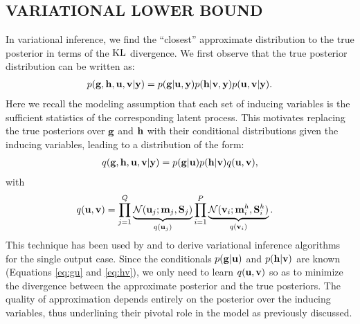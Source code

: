 \subsection{VARIATIONAL LOWER BOUND \label{sec:variationalLowerBound}}
\newcommand{\ug}{\u_g}
\newcommand{\uh}{\u^h}
\newcommand{\mgj}{\m_j}
\newcommand{\mhi}{\m^h_i}
\newcommand{\Sgj}{\S_j}
\newcommand{\Shi}{\S^h_i}
In variational inference, we find the ``closest'' approximate distribution to the true posterior in terms of the $\text{KL}$ divergence.
We first observe that the true posterior distribution can be written as:
\begin{align}
p(\mathbf{g}, \mathbf{h}, \mathbf{u}, \mathbf{v} | \mathbf{y}) = p(\mathbf{g} | \mathbf{u}, \mathbf{y}) p(\mathbf{h} | \mathbf{v}, \mathbf{y}) p(\mathbf{u}, \mathbf{v} | \mathbf{y}).
\end{align}
Here we recall the modeling assumption that each set of  inducing variables is the sufficient statistics of the corresponding latent process. 
This motivates replacing the true posteriors over $\mathbf{g}$ and $\mathbf{h}$ with their conditional distributions given the inducing variables, leading to a distribution of the form:
\begin{align}
q(\mathbf{g}, \mathbf{h}, \mathbf{u}, \mathbf{v} | \mathbf{y})
= p(\mathbf{g}|\mathbf{u}) p(\mathbf{h}|\mathbf{v}) q(\mathbf{u},\mathbf{v}),
\end{align}
with
\begin{align}
q(\u,\v) &= \prod_{j=1}^Q \underbrace{\Normal(\u_j; \mgj, \Sgj)}_{q(\u_j)} \prod_{i=1}^P  \underbrace{\Normal(\v_i; \mhi, \Shi)}_{q(\v_i)}.
\end{align}
This technique has been used by \citet{titsias2009variational} and \citet{hensmangaussian} 
to derive variational inference algorithms for the single output case.
Since the conditionals $p(\mathbf{g} | \mathbf{u})$ and $p(\mathbf{h} | \mathbf{v})$ are known (Equations \eqref{eq:gu} and \eqref{eq:hv}), 
we only need to 
learn $q(\mathbf{u}, \mathbf{v})$ so as to minimize the divergence between the approximate posterior and
the true posteriors.
The quality of approximation depends entirely on the posterior over the inducing variables, thus underlining their pivotal role in the model as previously discussed.

